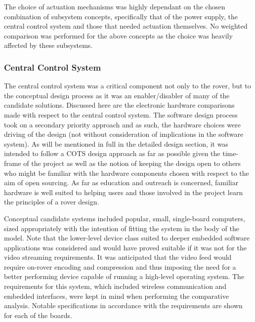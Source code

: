        The choice of actuation mechanisms was highly dependant on the chosen combination of subsystem concepts, specifically that of the power supply, the central control system and those that needed actuation themselves. No weighted comparison was performed for the above concepts as the choice was heavily affected by these subsystems.
    
    \subsubsection{Central Control System}
    \label{subsubsec:central-control-system}
      The central control system was a critical component not only to the rover, but to the conceptual design process as it was an enabler/disabler of many of the candidate solutions. Discussed here are the electronic hardware comparisons made with respect to the central control system. The software design process took on a secondary priority approach and as such, the hardware choices were driving of the design (not without consideration of implications in the software system). As will be mentioned in full in the detailed design section, it was intended to follow a COTS design approach as far as possible given the time-frame of the project as well as the notion of keeping the design open to others who might be familiar with the hardware components chosen with respect to the aim of open sourcing. As far as education and outreach is concerned, familiar hardware is well suited to helping users and those involved in the project learn the principles of a rover design.
      
      Conceptual candidate systems included popular, small, single-board computers, sized appropriately with the intention of fitting the system in the body of the model. Note that the lower-level device class suited to deeper embedded software applications was considered and would have proved suitable if it was not for the video streaming requirements. It was anticipated that the video feed would require on-rover encoding and compression and thus imposing the need for a better performing device capable of running a high-level operating system. The requirements for this system, which included wireless communication and embedded interfaces, were kept in mind when performing the comparative analysis. Notable specifications in accordance with the requirements are shown for each of the boards.
      
